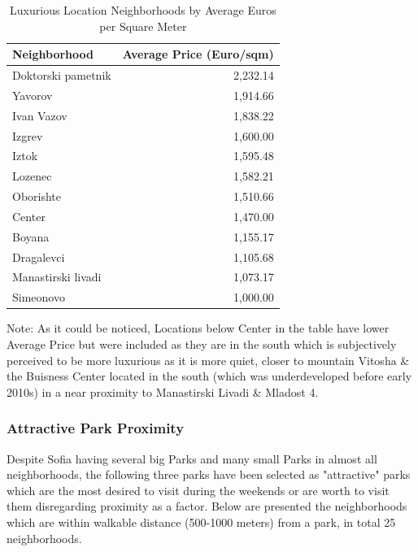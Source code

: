 \documentclass[]{article}
\begin{document}
\begin{table}[H] %
	\centering
	\caption{Luxurious Location Neighborhoods by Average Euros per Square Meter}
	\begin{tabular}{l r} %
		\hline
		\textbf{Neighborhood}               & \textbf{Average Price (Euro/sqm)} \\ \hline
		Doktorski pametnik                   & 2,232.14                          \\ 
		Yavorov                             & 1,914.66                          \\ 
		Ivan Vazov                          & 1,838.22                          \\ 
		Izgrev                              & 1,600.00                          \\ 
		Iztok                               & 1,595.48                          \\ 
		Lozenec                             & 1,582.21                          \\ 
		Oborishte                           & 1,510.66                          \\ 
		Center                              & 1,470.00                          \\ \hline
		Boyana                              & 1,155.17                          \\ 
		Dragalevci                          & 1,105.68                          \\ 
		Manastirski livadi                  & 1,073.17                          \\ 
		Simeonovo                           & 1,000.00                          \\ 
	\end{tabular}
\end{table}
\begin{center}
	\scriptsize
	Note: As it could be noticed, Locations below Center in the table have lower Average Price but were included as they are in the south which is subjectively perceived to be more luxurious as it is more quiet, closer to mountain Vitosha \& the Buisness Center located in the south (which was underdeveloped before early 2010s) in a near proximity to Manastirski Livadi \& Mladost 4.
\end{center}


\subsubsection{Attractive Park Proximity}
Despite Sofia having several big Parks and many small Parks in almost all neighborhoods, the following three parks have been selected as "attractive" parks which are the most desired to visit during the weekends or are worth to visit them disregarding proximity as a factor. Below are presented the neighborhoods which are within walkable distance (500-1000 meters) from a park, in total 25 neighborhoods.
\end{document}
